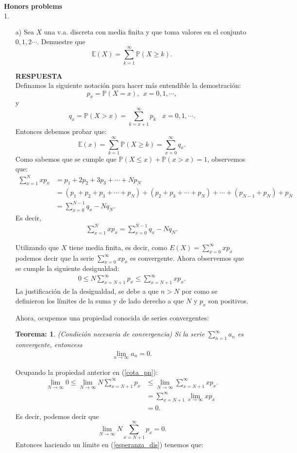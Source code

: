 \documentclass[11pt,letterpaper]{article}
\newcommand{\mP}{\mathbb{P}}
\newcommand{\mE}{\mathbb{E}}
\newcommand{\res}{\textbf{RESPUESTA}\\}
\newtheorem{thm}{Teorema:}
\begin{document}
\textbf{Honors problems} \\
1. \begin{itemize}
\item[a)] Sea $X$ una v.a. discreta con media finita y que toma valores en el conjunto $0,1,2\cdots .$ Demuestre que 
$$\mE(X)=\sum_{k=1}^\infty \mP(X\geq k).$$

\res Definamos la siguiente notación para hacer más entendible la demostración: $$p_x=\mP(X=x), \ \ x=0,1,\cdots,$$ y $$q_x=\mP(X> x)=\sum_{k=x+1}^\infty p_k \ \ \ \ x=0,1,\cdots.$$
Entonces debemos probar que:
$$\mE(x)=\sum_{k=1}^\infty \mP(X\geq k)=\sum_{x=0}^\infty q_x.$$
Como sabemos que se cumple que $\mP(X\leq x) +\mP(x>x)=1$, observemos que:
\begin{align*}
\sum_{x=1}^Nxp_x&=p_1+2p_2+3p_3+\cdots+Np_N\\
&=(p_1+p_2+p_3+\cdots+p_N)+(p_2+p_3+\cdots+p_N)+\cdots+(p_{N-1}+p_N)+p_N\\
&=\sum_{x=0}^{N-1} q_x-Nq_N.
\end{align*}
Es decir,
\begin{align}
\label{esperanza_dis}
\sum_{x=1}^Nxp_x= \sum_{x=0}^{N-1} q_x-Nq_N.
\end{align}

Utilizando que $X$ tiene media finita, es decir, como $E(X)=\sum_{x=0}^\infty xp_x$ podemos decir que la serie $\sum_{x=0}^\infty xp_x$ es convergente. Ahora observemos que se cumple la siguiente desigualdad:
\begin{align}
\label{cota_pn}
0 \leq N\sum_{x=N+1}^\infty p_x \leq \sum_{x=N+1}^\infty x p_x.
\end{align} 
La justificación de la desigualdad, se debe a que $n>N$ por como se definieron los límites de la suma y de lado derecho a que $N$ y $p_x$ son positivos. 

Ahora, ocupemos una propiedad conocida de series convergentes: 
\begin{framed}
    \begin{thm} (Condición necesaria de convergencia) Si la serie $\sum_{n=1}^\infty a_n$ es convergente, entoncess 
        \begin{align*}
        \lim_{n\rightarrow  \infty} a_n=0.
        \end{align*}
    \end{thm}
\end{framed} 
Ocupando la propiedad anterior en (\ref{cota_pn}):
\begin{align*}
\lim_{N\rightarrow\infty } 0 \leq \lim_{N\rightarrow\infty } N \sum_{x=N+1}^\infty p_x &\leq \lim_{N\rightarrow\infty } \sum_{x=N+1}^\infty x p_x.\\
&=\sum_{x=N+1}^\infty \lim_{x\rightarrow\infty }x p_x\\
&=0.
\end{align*} 
Es decir, podemos decir que
$$\lim_{N\rightarrow\infty } N \sum_{x=N+1}^\infty p_x =0.$$
Entonces haciendo un límite en (\ref{esperanza_dis}) tenemos que:


\end{itemize}
\end{document}

